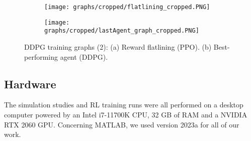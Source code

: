 \begin{figure}[h]
	\begin{subfigure}{\textwidth} %
		\centering
		\texttt{[image: graphs/cropped/flatlining\_cropped.PNG]}  %
		\caption{}
		\label{figure: RL c}
	\end{subfigure}
	\begin{subfigure}{\textwidth}
		\centering
		\texttt{[image: graphs/cropped/lastAgent\_graph\_cropped.PNG]}  
		\caption{}
		\label{figure: RL d}
	\end{subfigure} 
	\caption[DDPG training graphs (2)]{DDPG training graphs (2):  (a) Reward flatlining (PPO). (b) Best-performing agent (DDPG).}
	\label{figure: DDPG learning graphs 2}
\end{figure}


\subsection{Hardware}
The simulation studies and RL training runs were all performed on a desktop computer powered by an Intel i7-11700K CPU, 32 GB of RAM and a NVIDIA RTX 2060 GPU.
Concerning MATLAB, we used version 2023a for all of our work.

